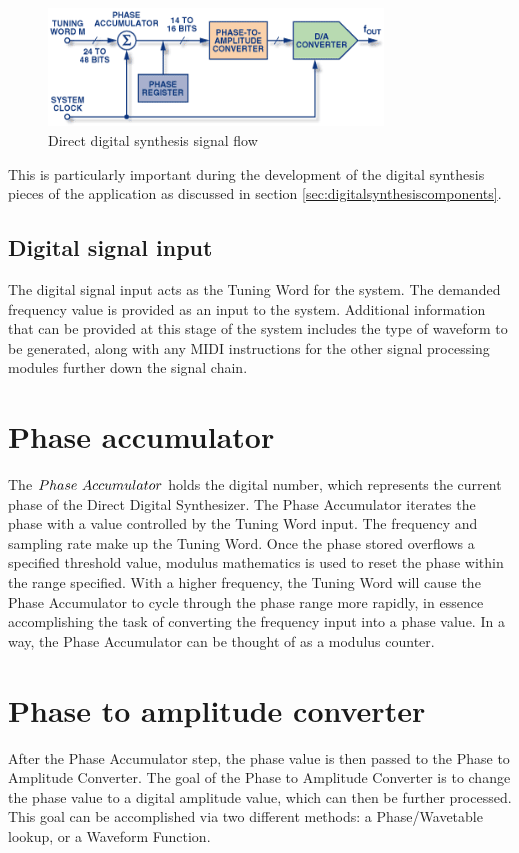 \documentclass[a4paper,12pt]{report}
\begin{document}
\begin{figure}
    \centering
    \includegraphics[width=24em]{DDS.png}
    \caption{Direct digital synthesis signal flow}
    \label{fig:dds}
\end{figure}

This is particularly important during the development of the digital synthesis pieces of the application as discussed in section \ref{sec:digitalsynthesiscomponents}.

\subsection{Digital signal input}
\label{subsec:digitalsignalinput}
The digital signal input acts as the Tuning Word for the system. The demanded frequency value is provided as an input to the system. Additional information that can be provided at this stage of the system includes the type of waveform to be generated, along with any MIDI instructions for the other signal processing modules further down the signal chain.

\section{Phase accumulator}
\label{sec:phaseaccu}
The $Phase\ \-Accumulator$ holds the digital number, which represents the current phase of the Direct Digital Synthesizer. The Phase Accumulator iterates the phase with a value controlled by the Tuning Word input. The frequency and sampling rate make up the Tuning Word. Once the phase stored overflows a specified threshold value, modulus mathematics is used to reset the phase within the range specified. With a higher frequency, the Tuning Word will cause the Phase Accumulator to cycle through the phase range more rapidly, in essence accomplishing the task of converting the frequency input into a phase value. In a way, the Phase Accumulator can be thought of as a modulus counter.

\section{Phase to amplitude converter}
\label{sec:phasetoamplitudeconverter}
After the Phase Accumulator step, the phase value is then passed to the Phase to Amplitude Converter. The goal of the Phase to Amplitude Converter is to change the phase value to a digital amplitude value, which can then be further processed. This goal can be accomplished via two different methods: a Phase/Wavetable lookup, or a Waveform Function.
\end{document}
